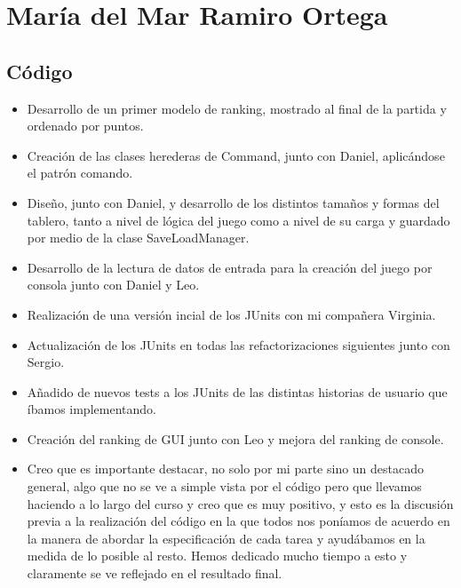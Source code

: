 \documentclass[../FINAL/Scrum/SCRUM.tex]{subfiles}
\begin{document}
\section{María del Mar Ramiro Ortega}
\subsection*{Código}
\begin{itemize}
\item Desarrollo de un primer modelo de ranking, mostrado al final de la partida y ordenado por puntos.
\item Creación de las clases herederas de Command, junto con Daniel, aplicándose el patrón comando.
\item Diseño, junto con Daniel, y desarrollo de los distintos tamaños y formas del tablero, tanto a nivel de lógica del juego como a nivel de su carga y guardado por medio de la clase SaveLoadManager.
\item Desarrollo de la lectura de datos de entrada para la creación del juego por consola junto con Daniel y Leo.
\item Realización de una versión incial de los JUnits con mi compañera Virginia.
\item Actualización de los JUnits en todas las refactorizaciones siguientes junto con Sergio.
\item Añadido de nuevos tests a los JUnits de las distintas historias de usuario que íbamos implementando.
\item Creación del ranking de GUI junto con Leo y mejora del ranking de console.
\item Creo que es importante destacar, no solo por mi parte sino un destacado general, algo que no se ve a simple vista por el código pero que llevamos haciendo a lo largo del curso y creo que es muy positivo, y esto es la discusión previa a la realización del código en la que todos nos poníamos de acuerdo en la manera de abordar la especificación de cada tarea y ayudábamos en la medida de lo posible al resto. Hemos dedicado mucho tiempo a esto y claramente se ve reflejado en el resultado final.
\end{itemize}
\end{document}
